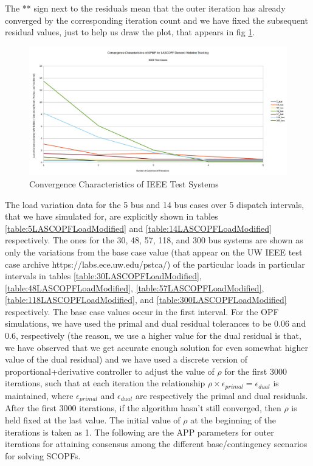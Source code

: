 \documentclass[preprint,12pt,3p]{elsarticle}
\begin{document}
The ** sign next to the residuals mean that the outer iteration has already converged by the corresponding iteration count and we have fixed the subsequent residual values, just to help us draw the plot, that appears in fig \ref{SummaryConv}. 
\begin{figure}
\begin{center}
\includegraphics[width=0.92\linewidth,trim=5mm 12mm 5mm 5mm, clip]{N-1_SCOPF_Summary_Improved.jpg}
\caption{Convergence Characteristics of IEEE Test Systems}
\label{SummaryConv}
\end{center}
\end{figure}
The load variation data for the 5 bus and 14 bus cases over 5 dispatch intervals, that we have simulated for, are explicitly shown in tables \ref{table:5LASCOPFLoadModified} and \ref{table:14LASCOPFLoadModified} respectively. The ones for the 30, 48, 57, 118, and 300 bus systems are shown as only the variations from the base case value (that appear on the UW IEEE test case archive https://labs.ece.uw.edu/pstca/) of the particular loads in particular intervals in tables \ref{table:30LASCOPFLoadModified}, \ref{table:48LASCOPFLoadModified}, \ref{table:57LASCOPFLoadModified}, \ref{table:118LASCOPFLoadModified}, and \ref{table:300LASCOPFLoadModified} respectively. The base case values occur in the first interval.
For the OPF simulations, we have used the primal and dual residual tolerances to be 0.06 and 0.6, respectively (the reason, we use a higher value for the dual residual is that, we have observed that we get accurate enough solution for even somewhat higher value of the dual residual) and we have used a discrete version of proportional+derivative controller to adjust the value of $\rho$ for the first 3000 iterations, such that at each iteration the relationship $\rho\times\epsilon_{primal}=\epsilon_{dual}$ is maintained, where $\epsilon_{primal}$ and $\epsilon_{dual}$ are respectively the primal and dual residuals. After the first 3000 iterations, if the algorithm hasn't still converged, then $\rho$ is held fixed at the last value. The initial value of $\rho$ at the beginning of the iterations is taken as 1. The following are the APP parameters for outer iterations for attaining consensus among the different base/contingency scenarios for solving SCOPFs.
\end{document}
